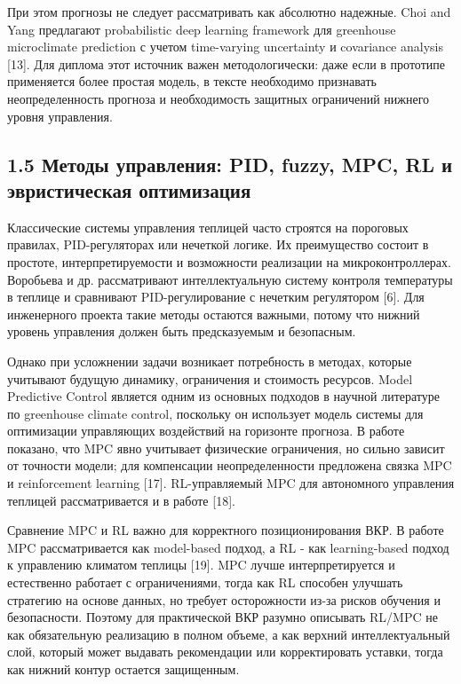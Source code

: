 \documentclass[a4paper,14pt]{extarticle}
\begin{document}
При этом прогнозы не следует рассматривать как абсолютно надежные. Choi
and Yang предлагают probabilistic deep learning framework для greenhouse
microclimate prediction с учетом time-varying uncertainty и covariance
analysis {[}13{]}. Для диплома этот источник важен методологически: даже
если в прототипе применяется более простая модель, в тексте необходимо
признавать неопределенность прогноза и необходимость защитных
ограничений нижнего уровня управления.

\hypertarget{ux43cux435ux442ux43eux434ux44b-ux443ux43fux440ux430ux432ux43bux435ux43dux438ux44f-pid-fuzzy-mpc-rl-ux438-ux44dux432ux440ux438ux441ux442ux438ux447ux435ux441ux43aux430ux44f-ux43eux43fux442ux438ux43cux438ux437ux430ux446ux438ux44f}{%
\subsection{1.5 Методы управления: PID, fuzzy, MPC, RL и эвристическая
оптимизация}\label{ux43cux435ux442ux43eux434ux44b-ux443ux43fux440ux430ux432ux43bux435ux43dux438ux44f-pid-fuzzy-mpc-rl-ux438-ux44dux432ux440ux438ux441ux442ux438ux447ux435ux441ux43aux430ux44f-ux43eux43fux442ux438ux43cux438ux437ux430ux446ux438ux44f}}

Классические системы управления теплицей часто строятся на пороговых
правилах, PID-регуляторах или нечеткой логике. Их преимущество состоит в
простоте, интерпретируемости и возможности реализации на
микроконтроллерах. Воробьева и др. рассматривают интеллектуальную
систему контроля температуры в теплице и сравнивают PID-регулирование с
нечетким регулятором {[}6{]}. Для инженерного проекта такие методы
остаются важными, потому что нижний уровень управления должен быть
предсказуемым и безопасным.

Однако при усложнении задачи возникает потребность в методах, которые
учитывают будущую динамику, ограничения и стоимость ресурсов. Model
Predictive Control является одним из основных подходов в научной
литературе по greenhouse climate control, поскольку он использует модель
системы для оптимизации управляющих воздействий на горизонте прогноза. В
работе показано, что MPC явно учитывает физические ограничения, но
сильно зависит от точности модели; для компенсации неопределенности
предложена связка MPC и reinforcement learning {[}17{]}. RL-управляемый
MPC для автономного управления теплицей рассматривается и в работе
{[}18{]}.

Сравнение MPC и RL важно для корректного позиционирования ВКР. В работе
MPC рассматривается как model-based подход, а RL - как learning-based
подход к управлению климатом теплицы {[}19{]}. MPC лучше
интерпретируется и естественно работает с ограничениями, тогда как RL
способен улучшать стратегию на основе данных, но требует осторожности
из-за рисков обучения и безопасности. Поэтому для практической ВКР
разумно описывать RL/MPC не как обязательную реализацию в полном объеме,
а как верхний интеллектуальный слой, который может выдавать рекомендации
или корректировать уставки, тогда как нижний контур остается защищенным.
\end{document}
